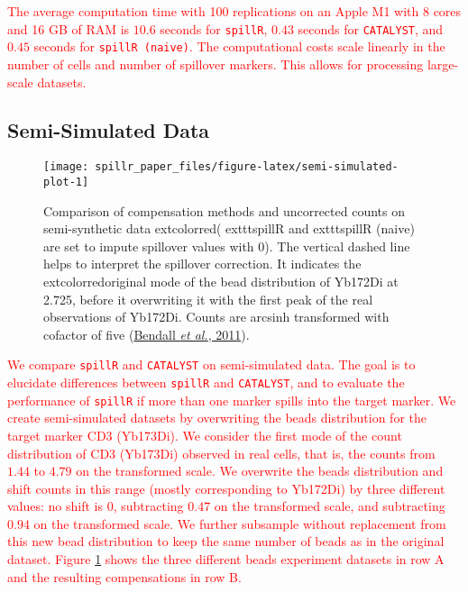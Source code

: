 \documentclass[
]{article}
\begin{document}
\textcolor{red}{
The average computation time with 100 replications on an Apple M1 with 8 cores and 16 GB of RAM is $10.6$ seconds for \texttt{spillR}, $0.43$ seconds for \texttt{CATALYST}, and $0.45$ seconds for \texttt{spillR (naive)}. The computational costs scale linearly in the number of cells and number of spillover markers. This allows for processing large-scale datasets.
}

\subsection{Semi-Simulated Data}\label{semi-simulated-data}

\begin{figure}

{\centering \texttt{[image: spillr\_paper\_files/figure-latex/semi-simulated-plot-1]} 

}

\caption{Comparison of compensation methods and uncorrected counts on semi-synthetic data   extcolor{red}{( exttt{spillR} and   exttt{spillR (naive)} are set to impute spillover values with $0$)}. The vertical dashed line helps to interpret the spillover correction. It indicates the     extcolor{red}{original mode of the bead distribution of Yb172Di at 2.725, before it overwriting it with the first peak of the real observations of Yb172Di}. Counts are arcsinh transformed with cofactor of five (\protect\hyperlink{ref-bendall2011single}{Bendall \emph{et al.}, 2011}).}\label{fig:semi-simulated-plot}
\end{figure}

\textcolor{red}{
We compare \texttt{spillR} and \texttt{CATALYST} on semi-simulated data. The goal is to elucidate differences between \texttt{spillR} and \texttt{CATALYST}, and to evaluate the performance of \texttt{spillR} if more than one marker spills into the target marker. We create semi-simulated datasets by overwriting the beads distribution for the target marker CD3 (Yb173Di). We consider the first mode of the count distribution of CD3 (Yb173Di) observed in real cells, that is, the counts from $1.44$ to $4.79$ on the transformed scale. We overwrite the beads distribution and shift counts in this range (mostly corresponding to Yb172Di) by three different values: no shift is $0$, subtracting $0.47$ on the transformed scale, and subtracting $0.94$ on the transformed scale. We further subsample without replacement from this new bead distribution to keep the same number of beads as in the original dataset. Figure \ref{fig:semi-simulated-plot} shows the three different beads experiment datasets in row A and the resulting compensations in row B.
}
\end{document}
